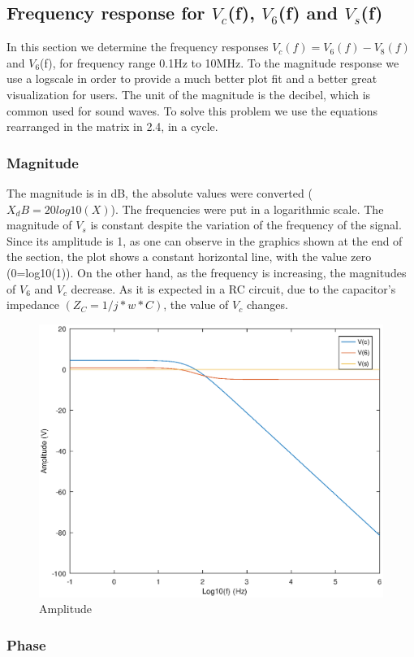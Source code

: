 \subsection{Frequency response for $V_c$(f), $V_6$(f) and $V_s$(f)}

In this section we determine the frequency responses $V_c(f) = V_6(f) - V_8(f)$ and $V_{6}$(f), for frequency range 0.1Hz to 10MHz. To the magnitude response we use a logscale in order to provide a much better plot fit and a better great visualization for users. The unit of the magnitude is the decibel, which is common used for sound waves. To solve this problem we use the equations rearranged in the matrix in 2.4, in a cycle.


\subsubsection{Magnitude}
The magnitude is in dB, the absolute values were converted ($X_dB=20log10(X)$). The frequencies were put in a logarithmic scale.
The magnitude of $V_s$ is constant despite the variation of the frequency of the signal. Since its amplitude is 1, as one can observe in the graphics shown at the end of the section, the plot shows a constant
horizontal line, with the value zero (0=log10(1)).
On the other hand, as the frequency is increasing, the magnitudes of $V_6$ and $V_c$ decrease. As it is expected in a  RC circuit, due to the capacitor's impedance $(Z_C = 1/j*w*C)$, the value of $V_c$ changes.

\begin{figure}[h] \centering
\includegraphics[width=0.7\linewidth]{amplitude.eps}
\caption{Amplitude}
\label{fig:snat}
\end{figure}

\subsubsection{Phase}

